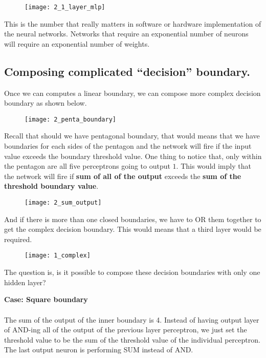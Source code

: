 \begin{figure}[H]
	\centering
	\texttt{[image: 2\_1\_layer\_mlp]}
\end{figure}

This is the number that really matters in software or hardware implementation of the neural networks. Networks that require an exponential number of neurons will require an exponential number of weights.

\subsection{Composing complicated ``decision'' boundary.}
Once we can computes a linear boundary, we can compose more complex decision boundary as shown below.

\begin{figure}[H]
	\centering
	\texttt{[image: 2\_penta\_boundary]}
\end{figure}

\hfill\break
Recall that should we have pentagonal boundary, that would means that we have boundaries for each sides of the pentagon and the network will fire if the input value exceeds the boundary threshold value. One thing to notice that, only within the pentagon are all five perceptrons going to output $1$. This would imply that the network will fire if \textbf{sum of all of the output} exceeds the \textbf{sum of the threshold boundary value}.

\begin{figure}[H]
	\centering
	\texttt{[image: 2\_sum\_output]}
\end{figure}

And if there is more than one closed boundaries, we have to OR them together to get the complex decision boundary. This would means that a third layer would be required.

\begin{figure}[H]
	\centering
	\texttt{[image: 1\_complex]}
\end{figure}

The question is, is it possible to compose these decision boundaries with only one hidden layer?

\hfill\break
\textbf{Case: Square boundary}
\\\\
The sum of the output of the inner boundary is 4. Instead of having output layer of AND-ing all of the output of the previous layer perceptron, we just set the threshold value to be the sum of the threshold value of the individual perceptron. The last output neuron is performing SUM instead of AND.


